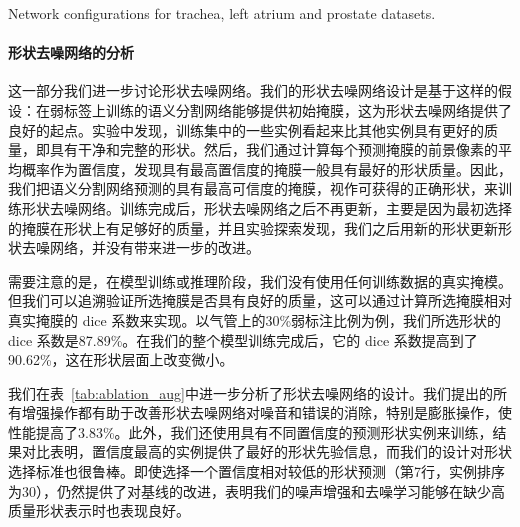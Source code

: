     \begin{table}[t!]
	\centering
    {Network configurations for trachea, left atrium and prostate datasets.}
	\label{tab:net_params}        
\end{table}


\paragraph{形状去噪网络的分析}
这一部分我们进一步讨论形状去噪网络。我们的形状去噪网络设计是基于这样的假设：在弱标签上训练的语义分割网络能够提供初始掩膜，这为形状去噪网络提供了良好的起点。实验中发现，训练集中的一些实例看起来比其他实例具有更好的质量，即具有干净和完整的形状。然后，我们通过计算每个预测掩膜的前景像素的平均概率作为置信度，发现具有最高置信度的掩膜一般具有最好的形状质量。因此，我们把语义分割网络预测的具有最高可信度的掩膜，视作可获得的正确形状，来训练形状去噪网络。训练完成后，形状去噪网络之后不再更新，主要是因为最初选择的掩膜在形状上有足够好的质量，并且实验探索发现，我们之后用新的形状更新形状去噪网络，并没有带来进一步的改进。

需要注意的是，在模型训练或推理阶段，我们没有使用任何训练数据的真实掩模。但我们可以追溯验证所选掩膜是否具有良好的质量，这可以通过计算所选掩膜相对真实掩膜的 dice 系数来实现。以气管上的30\%弱标注比例为例，我们所选形状的 dice 系数是87.89\%。在我们的整个模型训练完成后，它的 dice 系数提高到了 90.62\%，这在形状层面上改变微小。

我们在表~\ref{tab:ablation_aug}中进一步分析了形状去噪网络的设计。我们提出的所有增强操作都有助于改善形状去噪网络对噪音和错误的消除，特别是膨胀操作，使性能提高了3.83\%。此外，我们还使用具有不同置信度的预测形状实例来训练，结果对比表明，置信度最高的实例提供了最好的形状先验信息，而我们的设计对形状选择标准也很鲁棒。即使选择一个置信度相对较低的形状预测（第7行，实例排序为30），仍然提供了对基线的改进，表明我们的噪声增强和去噪学习能够在缺少高质量形状表示时也表现良好。

